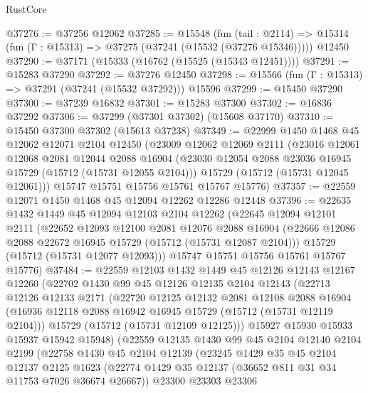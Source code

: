 \begin{lexlean}{RustCore}
\begin{coremodule}
@37276 := @37256 @12062
@37285 := @15548
    (fun (tail : @2114) => @15314 (fun (Γ : @15313) => @37275 (@37241 (@15532 (@37276 @15346)))))
    @12450
@37290 := @37171 (@15333 (@16762 (@15525 (@15343 @12451))))
@37291 := @15283 @37290
@37292 := @37276 @12450
@37298 := @15566 (fun (Γ : @15313) => @37291 (@37241 (@15532 @37292))) @15596
@37299 := @15450 @37290
@37300 := @37239 @16832
@37301 := @15283 @37300
@37302 := @16836 @37292
@37306 := @37299 (@37301 @37302) (@15608 @37170)
@37310 := @15450 @37300 @37302 (@15613 @37238)
@37349 := @22999
    @1450
    @1468
    @45
    @12062
    @12071
    @2104
    @12450
    (@23009
      @12062
      @12069
      @2111
      (@23016
        @12061
        @12068
        @2081
        @12044
        @2088
        @16904
        (@23030 @12054 @2088 @23036 @16945 @15729 (@15712 (@15731 @12055 @2104)))
        @15729
        (@15712 (@15731 @12045 @12061)))
      @15747
      @15751
      @15756
      @15761
      @15767
      @15776)
@37357 := @22559 @12071 @1450 @1468 @45 @12094 @12262 @12286 @12448
@37396 := @22635
    @1432
    @1449
    @45
    @12094
    @12103
    @2104
    @12262
    (@22645
      @12094
      @12101
      @2111
      (@22652
        @12093
        @12100
        @2081
        @12076
        @2088
        @16904
        (@22666 @12086 @2088 @22672 @16945 @15729 (@15712 (@15731 @12087 @2104)))
        @15729
        (@15712 (@15731 @12077 @12093)))
      @15747
      @15751
      @15756
      @15761
      @15767
      @15776)
@37484 := @22559
    @12103
    @1432
    @1449
    @45
    @12126
    @12143
    @12167
    @12260
    (@22702
      @1430
      @99
      @45
      @12126
      @12135
      @2104
      @12143
      (@22713
        @12126
        @12133
        @2171
        (@22720
          @12125
          @12132
          @2081
          @12108
          @2088
          @16904
          (@16936 @12118 @2088 @16942 @16945 @15729 (@15712 (@15731 @12119 @2104)))
          @15729
          (@15712 (@15731 @12109 @12125)))
        @15927
        @15930
        @15933
        @15937
        @15942
        @15948)
      (@22559
        @12135
        @1430
        @99
        @45
        @2104
        @12140
        @2104
        @2199
        (@22758
          @1430
          @45
          @2104
          @12139
          (@23245
            @1429
            @35
            @45
            @2104
            @12137
            @2125
            @1623
            (@22774 @1429 @35 @12137 (@36652 @811 @31 @34 @11753 @7026 @36674 @26667))
            @23300
            @23303
            @23306

\end{coremodule}
\end{lexlean}
